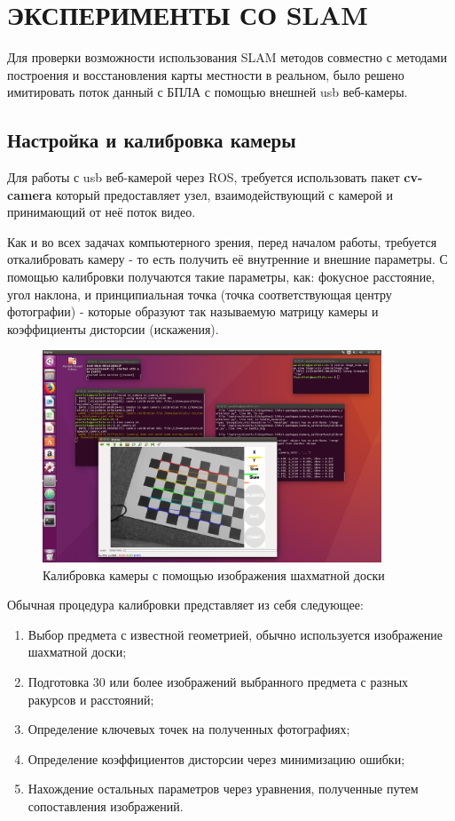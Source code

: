 \chapter{ЭКСПЕРИМЕНТЫ СО SLAM}

Для проверки возможности использования SLAM методов совместно с методами построения и восстановления карты местности в реальном, было решено имитировать поток данный с БПЛА с помощью внешней usb веб-камеры.

\section{Настройка и калибровка камеры}

Для работы с usb веб-камерой через ROS, требуется использовать пакет \textbf{cv-camera} который предоставляет узел, взаимодействующий с камерой и принимающий от неё поток видео.

Как и во всех задачах компьютерного зрения, перед началом работы, требуется откалибровать камеру - то есть получить её внутренние и внешние параметры. С помощью калибровки получаются такие параметры, как: фокусное расстояние, угол наклона, и принципиальная точка (точка соответствующая центру фотографии) - которые образуют так называемую матрицу камеры и коэффициенты дисторсии (искажения).

\begin{figure}[h]
    \centering
    \includegraphics[width=0.9\textwidth]{images/chess.png}
    \caption{Калибровка камеры с помощью изображения шахматной доски}
    \label{fig:chess}
\end{figure}

\vspace{1em}
Обычная процедура калибровки представляет из себя следующее:
\begin{enumerate}
    \item Выбор предмета с известной геометрией, обычно используется изображение шахматной доски;
    \item Подготовка 30 или более изображений выбранного предмета с разных ракурсов и расстояний;
    \item Определение ключевых точек на полученных фотографиях;
    \item Определение коэффициентов дисторсии через минимизацию ошибки;
    \item Нахождение остальных параметров через уравнения, полученные путем сопоставления изображений.
\end{enumerate}

